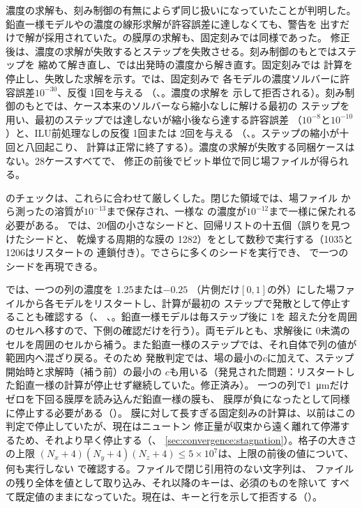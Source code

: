 濃度の求解も、刻み制御の有無によらず同じ扱いになっていたことが判明した。
鉛直一様モデルやの濃度の線形求解が許容誤差に達しなくても、警告を
出すだけで解が採用されていた。の膜厚の求解も、固定刻みでは同様であった。
修正後は、濃度の求解が失敗するとステップを失敗させる。刻み制御のもとではステップを
縮めて解き直し、では出発時の濃度から解き直す。固定刻みでは
計算を停止し、失敗した求解を示す。では、固定刻みで
各モデルの濃度ソルバーに許容誤差$10^{-30}$、反復 1回を与える
（、。濃度の求解を
示して拒否される）。刻み制御のもとでは、ケース本来のソルバーなら縮小なしに解ける最初の
ステップを用い、最初のステップでは達しないが縮小後なら達する許容誤差
（$10^{-8}$と$10^{-10}$）と、ILU前処理なしの反復 1回または 2回を与える
（、。ステップの縮小が十回と八回起こり、
計算は正常に終了する）。濃度の求解が失敗する同梱ケースはない。28ケースすべてで、
修正の前後でビット単位で同じ場ファイルが得られる。

のチェックは、これらに合わせて厳しくした。閉じた領域では、場ファイル
から測ったの溶質が$10^{-13}$まで保存され、一様な
の濃度が$10^{-12}$まで一様に保たれる必要がある。
では、20個の小さなシードと、回帰リストの十五個（誤りを見つけたシードと、
乾燥する周期的な膜の 1282）をとして数秒で実行する（1035と 1206はリスタートの
連鎖付き）。でさらに多くのシードを実行でき、
で一つのシードを再現できる。

では、一つの列の濃度を 1.25または$-0.25$
（片側だけ$[0, 1]$の外）にした場ファイルから各モデルをリスタートし、計算が最初の
ステップで発散として停止することも確認する（、
、。鉛直一様モデルは毎ステップ後に 1を
超えた分を周囲のセルへ移すので、下側の確認だけを行う）。両モデルとも、求解後に 0未満の
セルを周囲のセルから補う。また鉛直一様のステップでは、それ自体で列の値が範囲内へ混ざり戻る。そのため
発散判定では、場の最小の$c$に加えて、ステップ開始時と求解時（補う前）の最小の
$c$も用いる（発見された問題：リスタートした鉛直一様の計算が停止せず継続していた。修正済み）。
一つの列で\SI{1}{\micro\metre}だけゼロを下回る膜厚を読み込んだ鉛直一様の膜も、
膜厚が負になったとして同様に停止する必要がある（）。
膜に対して長すぎる固定刻みの計算は、以前はこの判定で停止していたが、現在はニュートン
修正量が収束から遠く離れて停滞するため、それより早く停止する（、
\cref{sec:convergence:stagnation}）。格子の大きさの上限
$(N_x+4)(N_y+4)(N_z+4) \le 5\times10^{7}$は、上限の前後の値について、何も実行しない
で確認する。ファイルで閉じ引用符のない文字列は、
ファイルの残り全体を値として取り込み、それ以降のキーは、必須のものを除いて
すべて既定値のままになっていた。現在は、キーと行を示して拒否する（）。

